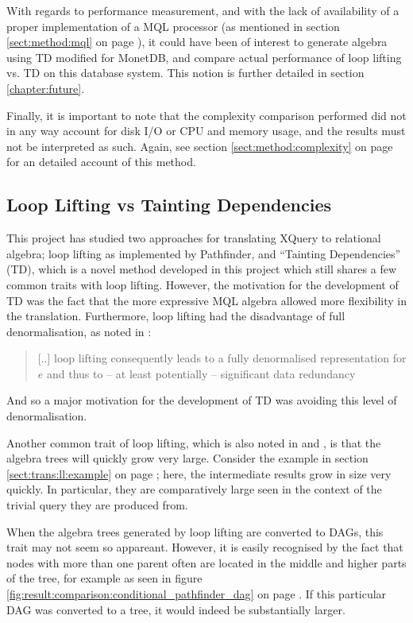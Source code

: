 With regards to performance measurement, and with the lack of availability of a
proper implementation of a MQL processor (as mentioned in section
\ref{sect:method:mql} on page \pageref{sect:method:mql}), it could have been
of interest to generate algebra using TD modified for MonetDB, and compare
actual performance of loop lifting vs. TD on this database system. This notion
is further detailed in section \ref{chapter:future}.

Finally, it is important to note that the complexity comparison performed did
not in any way account for disk I/O or CPU and memory usage, and the results
must not be interpreted as such. Again, see section \ref{sect:method:complexity} on
page \pageref{sect:method:complexity} for an detailed account of this method.

\subsection{Loop Lifting vs Tainting Dependencies}
\label{sect:disc:llvsTD}
This project has studied two approaches for translating XQuery to relational
algebra; loop lifting as implemented by Pathfinder, and ``Tainting
Dependencies'' (TD), which is a novel method developed in this project which
still shares a few common traits with loop lifting. However, the motivation for
the development of TD was the fact that the more expressive MQL algebra allowed
more flexibility in the translation. Furthermore, loop lifting had the
disadvantage of full denormalisation, as noted in
\cite{pathfinder_purelyRelational}: 

\begin{quote}
[..] loop lifting consequently leads to a fully denormalised representation for
$e$ and thus to -- at least potentially -- significant data redundancy
\end{quote}

And so a major motivation for the development of TD was avoiding this level of
denormalisation.

Another common trait of loop lifting, which is also noted in
\cite{pathfinder_mothertongue} and \cite{pathfinder_purelyRelational}, is that
the algebra trees will quickly grow very large. Consider the example in section 
\ref{sect:trans:ll:example} on page \pageref{sect:trans:ll:example}; here, the
intermediate results grow in size very quickly. In particular, they are
comparatively large seen in the context of the trivial query they are produced
from.

When the algebra trees generated by loop lifting are converted to DAGs, this
trait may not seem so appareant. However, it is easily recognised by the fact
that nodes with more than one parent often are located in the middle and higher
parts of the tree, for example as seen in figure
\ref{fig:result:comparison:conditional_pathfinder_dag} on page
\pageref{fig:result:comparison:conditional_pathfinder_dag}. If this particular
DAG was converted to a tree, it would indeed be substantially larger.

